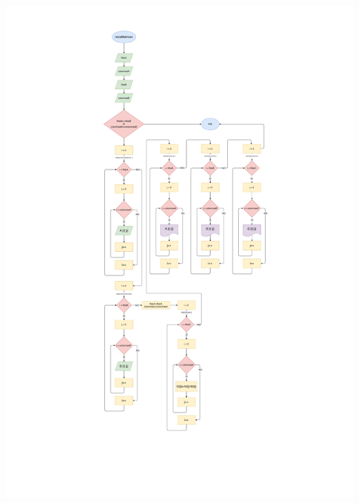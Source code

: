 \documentclass[letter]{revtex4}
\begin{document}
\begin{center}
 	\includegraphics[scale=0.3]{Images/Resta.pdf}
 	\label{figura4}
 \end{center}
 
\clearpage
\end{document}

